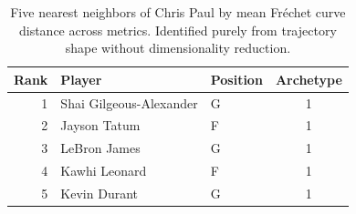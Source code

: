 \begin{table}[htbp]
  \centering\small
  \begin{tabular}{rllc}
    \toprule
    Rank & Player & Position & Archetype \\
    \midrule
    1 & Shai Gilgeous-Alexander & G & 1 \\
    2 & Jayson Tatum & F & 1 \\
    3 & LeBron James & G & 1 \\
    4 & Kawhi Leonard & F & 1 \\
    5 & Kevin Durant & G & 1 \\
    \bottomrule
  \end{tabular}
  \caption{Five nearest neighbors of Chris Paul by mean Fr\'{e}chet curve distance across metrics. Identified purely from trajectory shape without dimensionality reduction.}
  \label{tab:Chris_Paul_frechet_curve_neighbors}
\end{table}

